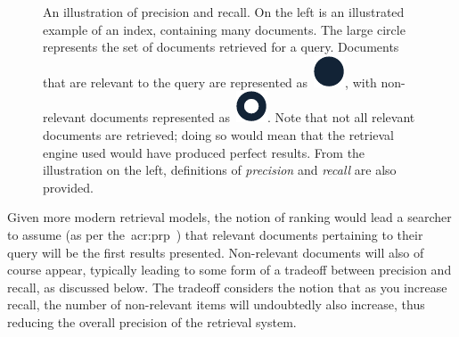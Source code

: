 \begin{figure}[t!]
    \centering
    \caption[Example illustration of precision and recall]{An illustration of precision and recall. On the left is an illustrated example of an index, containing many documents. The large circle represents the set of documents retrieved for a query. Documents that are relevant to the query are represented as~\includegraphics[height=\fontcharht\font`\d]{figures/ch2-pr-r.pdf}, with non-relevant documents represented as~\includegraphics[height=\fontcharht\font`\d]{figures/ch2-pr-nr.pdf}. Note that not all relevant documents are retrieved; doing so would mean that the retrieval engine used would have produced perfect results. From the illustration on the left, definitions of \emph{precision} and \emph{recall} are also provided.}
    \label{fig:pr}
\end{figure}

Given more modern retrieval models, the notion of ranking would lead a searcher to assume (as per the~\gls{acr:prp}~\citep{robertson1977prp}) that relevant documents pertaining to their query will be the first results presented. Non-relevant documents will also of course appear, typically leading to some form of a tradeoff between precision and recall, as discussed below. The tradeoff considers the notion that as you increase recall, the number of non-relevant items will undoubtedly also increase, thus reducing the overall precision of the retrieval system.

